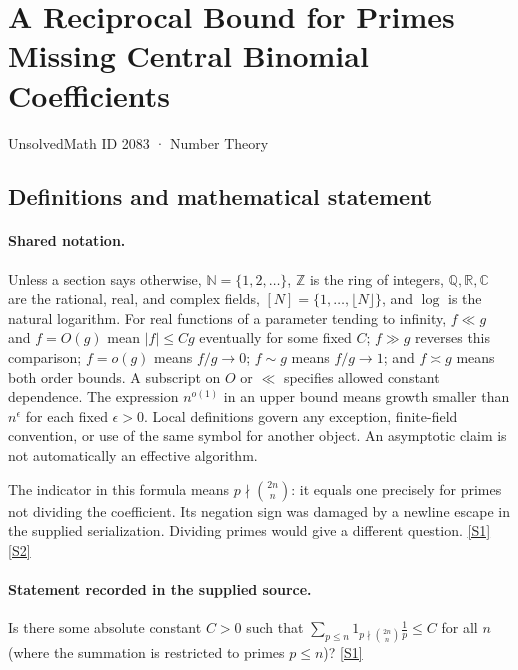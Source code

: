 \documentclass[11pt,a4paper]{article}
\newcommand{\N}{\mathbb{N}}
\newcommand{\Z}{\mathbb{Z}}
\newcommand{\Q}{\mathbb{Q}}
\newcommand{\R}{\mathbb{R}}
\newcommand{\C}{\mathbb{C}}
\newcommand{\sref}[2]{\hyperlink{source:#1:#2}{[S#2]}}
\begin{document}

\setcounter{section}{2082}

\section{A Reciprocal Bound for Primes Missing Central Binomial Coefficients}\label{2083}

{\small\sffamily UnsolvedMath ID 2083 · Number Theory}

\subsection{Definitions and mathematical statement}

\paragraph{Shared notation.}Unless a section says otherwise, $\N=\{1,2,\ldots\}$,
$\Z$ is the ring of integers, $\Q,\R,\C$ are the rational, real, and complex
fields, $[N]=\{1,\ldots,\lfloor N\rfloor\}$, and $\log$ is the natural
logarithm. For real functions of a parameter tending to infinity,
$f\ll g$ and $f=O(g)$ mean $|f|\leq Cg$ eventually for some fixed $C$;
$f\gg g$ reverses this comparison; $f=o(g)$ means $f/g\to0$;
$f\sim g$ means $f/g\to1$; and $f\asymp g$ means both order bounds.
A subscript on $O$ or $\ll$ specifies allowed constant dependence.
The expression $n^{o(1)}$ in an upper bound means growth smaller than
$n^\epsilon$ for each fixed $\epsilon>0$. Local definitions govern any
exception, finite-field convention, or use of the same symbol for another
object. An asymptotic claim is not automatically an effective algorithm.



The indicator in this formula means $p\nmid\binom{2n}{n}$: it equals one precisely for primes not dividing the coefficient. Its negation sign was damaged by a newline escape in the supplied serialization. Dividing primes would give a different question. \sref{2083}{1} \sref{2083}{2}

\paragraph{Statement recorded in the supplied source.}
Is there some absolute constant $C>0$ such that $ \sum_{p\leq n}1_{p\nmid \binom{2n}{n}}\frac{1}{p}\leq C $ for all $n$ (where the summation is restricted to primes $p\leq n$)? \sref{2083}{1}
\end{document}
